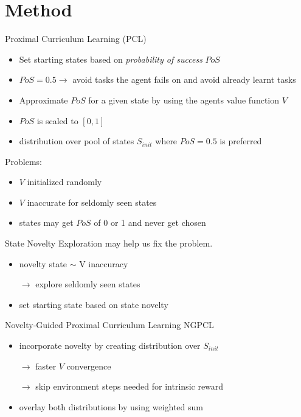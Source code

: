 \documentclass[aspectratio=169]{beamer}
\begin{document}
\section{Method}
\begin{frame}{Proximal Curriculum Learning (PCL)~\cite{prox_curr}}
  \begin{itemize}
    \item Set starting states based on \textit{probability of success} $PoS$
    \item $PoS = 0.5 \rightarrow$ avoid tasks the agent fails on and avoid already learnt tasks
    \item Approximate $PoS$ for a given state by using the agents value function $V$
    \item $PoS$ is scaled to $[0, 1]$
    \item distribution over pool of states $S_{init}$ where $PoS = 0.5$ is preferred
  \end{itemize}
  \vfill
  \pause
  Problems:
  \begin{itemize}
    \item $V$ initialized randomly
    \item $V$ inaccurate for seldomly seen states
    \item states may get $PoS$ of 0 or 1 and never get chosen
  \end{itemize}
\end{frame}

\begin{frame}{State Novelty}
  Exploration may help us fix the problem.
  \begin{itemize}
    \item novelty state $\sim$ V inaccuracy
    \item[$\rightarrow$] explore seldomly seen states
    \item set starting state based on state novelty
  \end{itemize}
\end{frame}

\begin{frame}{Novelty-Guided Proximal Curriculum Learning NGPCL}
  \begin{itemize}
    \item incorporate novelty by creating distribution over $S_{init}$
    \item[$\rightarrow$] faster $V$ convergence
    \item[$\rightarrow$] skip environment steps needed for intrinsic reward
    \item overlay both distributions by using weighted sum
  \end{itemize}
\end{frame}
\end{document}
